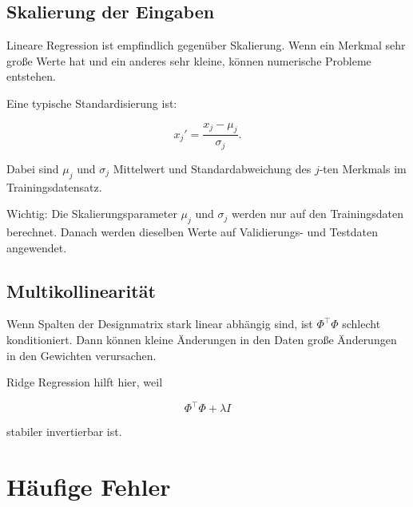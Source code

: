 \subsection{Skalierung der Eingaben}

Lineare Regression ist empfindlich gegenüber Skalierung.
Wenn ein Merkmal sehr große Werte hat und ein anderes sehr kleine, können numerische Probleme entstehen.

Eine typische Standardisierung ist:

\[
    x_j'
    =
    \frac{x_j-\mu_j}{\sigma_j}.
\]

Dabei sind \(\mu_j\) und \(\sigma_j\) Mittelwert und Standardabweichung des \(j\)-ten Merkmals im Trainingsdatensatz.

\begin{examtipbox}
Wichtig:
Die Skalierungsparameter \(\mu_j\) und \(\sigma_j\) werden nur auf den Trainingsdaten berechnet.
Danach werden dieselben Werte auf Validierungs- und Testdaten angewendet.
\end{examtipbox}

\subsection{Multikollinearität}

Wenn Spalten der Designmatrix stark linear abhängig sind, ist \(\Phi^{\top}\Phi\) schlecht konditioniert.
Dann können kleine Änderungen in den Daten große Änderungen in den Gewichten verursachen.

Ridge Regression hilft hier, weil

\[
    \Phi^{\top}\Phi+\lambda I
\]

stabiler invertierbar ist.

\section{Häufige Fehler}

